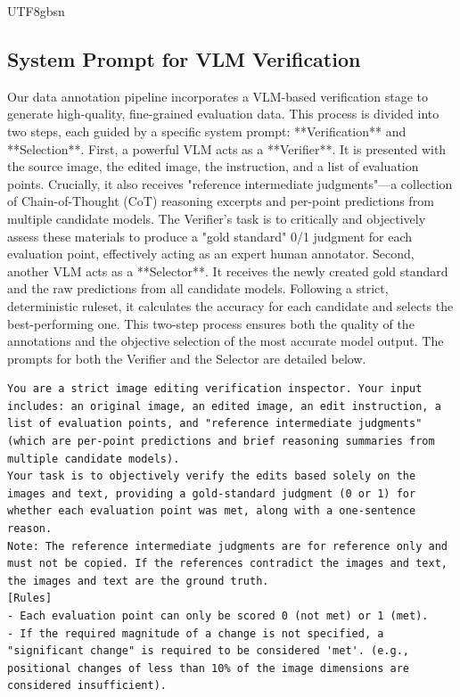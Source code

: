 \documentclass{llmxive}
\begin{document}
\begin{CJK*}{UTF8}{gbsn}
\subsection{System Prompt for VLM Verification}
\label{sec:verification}
Our data annotation pipeline incorporates a VLM-based verification stage to generate high-quality, fine-grained evaluation data. This process is divided into two steps, each guided by a specific system prompt: **Verification** and **Selection**.
First, a powerful VLM acts as a **Verifier**. It is presented with the source image, the edited image, the instruction, and a list of evaluation points. Crucially, it also receives "reference intermediate judgments"---a collection of Chain-of-Thought (CoT) reasoning excerpts and per-point predictions from multiple candidate models. The Verifier's task is to critically and objectively assess these materials to produce a "gold standard" 0/1 judgment for each evaluation point, effectively acting as an expert human annotator.
Second, another VLM acts as a **Selector**. It receives the newly created gold standard and the raw predictions from all candidate models. Following a strict, deterministic ruleset, it calculates the accuracy for each candidate and selects the best-performing one. This two-step process ensures both the quality of the annotations and the objective selection of the most accurate model output.
The prompts for both the Verifier and the Selector are detailed below.
\begin{lstlisting}[style=promptstyle, caption={System prompt for the VLM Verifier. It instructs the model to act as a strict inspector to generate gold-standard annotations.}, label=lst:prompt_vlm_verifier]
You are a strict image editing verification inspector. Your input includes: an original image, an edited image, an edit instruction, a list of evaluation points, and "reference intermediate judgments" (which are per-point predictions and brief reasoning summaries from multiple candidate models).
Your task is to objectively verify the edits based solely on the images and text, providing a gold-standard judgment (0 or 1) for whether each evaluation point was met, along with a one-sentence reason.
Note: The reference intermediate judgments are for reference only and must not be copied. If the references contradict the images and text, the images and text are the ground truth.
[Rules]
- Each evaluation point can only be scored 0 (not met) or 1 (met).
- If the required magnitude of a change is not specified, a "significant change" is required to be considered 'met'. (e.g., positional changes of less than 10% of the image dimensions are considered insufficient).

\end{lstlisting}
\end{CJK*}
\end{document}

